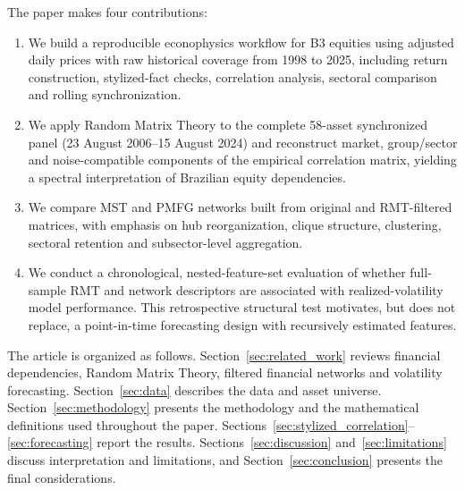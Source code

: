 The paper makes four contributions:
\begin{enumerate}
  \item We build a reproducible econophysics workflow for B3 equities using adjusted daily prices with raw historical coverage from 1998 to 2025, including return construction, stylized-fact checks, correlation analysis, sectoral comparison and rolling synchronization.
  \item We apply Random Matrix Theory to the complete 58-asset synchronized panel (23 August 2006--15 August 2024) and reconstruct market, group/sector and noise-compatible components of the empirical correlation matrix, yielding a spectral interpretation of Brazilian equity dependencies.
  \item We compare MST and PMFG networks built from original and RMT-filtered matrices, with emphasis on hub reorganization, clique structure, clustering, sectoral retention and subsector-level aggregation.
  \item We conduct a chronological, nested-feature-set evaluation of whether full-sample RMT and network descriptors are associated with realized-volatility model performance. This retrospective structural test motivates, but does not replace, a point-in-time forecasting design with recursively estimated features.
\end{enumerate}

The article is organized as follows. Section~\ref{sec:related_work} reviews financial dependencies, Random Matrix Theory, filtered financial networks and volatility forecasting. Section~\ref{sec:data} describes the data and asset universe. Section~\ref{sec:methodology} presents the methodology and the mathematical definitions used throughout the paper. Sections~\ref{sec:stylized_correlation}--\ref{sec:forecasting} report the results. Sections~\ref{sec:discussion} and~\ref{sec:limitations} discuss interpretation and limitations, and Section~\ref{sec:conclusion} presents the final considerations.
